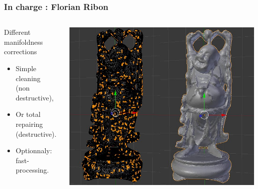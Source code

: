 \documentclass{beamer}
\begin{document}
\begin{frame}
	\frametitle{In charge : Florian Ribon}

    \begin{columns}[t]
  	\begin{column}{5cm}
        \begin{block}{Different manifoldness corrections}
		    \begin{itemize}
			    \item Simple cleaning\\\small(non destructive),
			    \item Or total repairing\\\small(destructive).
			    \item Optionnaly: fast-processing.
		    \end{itemize}
        \end{block}
    \end{column}

    \begin{column}{6cm}
        \begin{center}
		    \includegraphics[height=.7\textheight]{repair}
	    \end{center}
    \end{column}

    \end{columns}
\end{frame}
\end{document}
